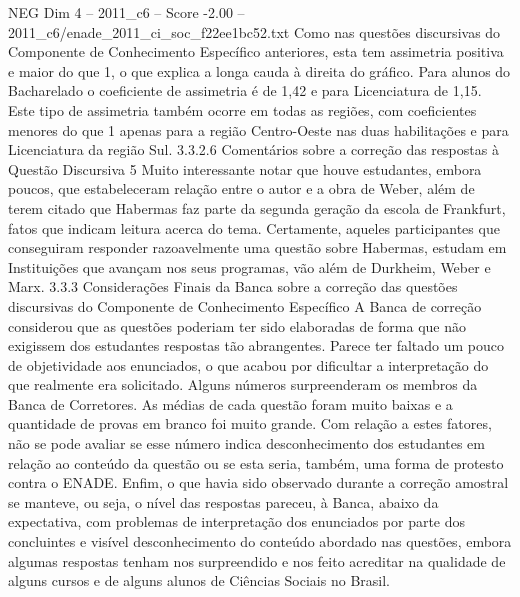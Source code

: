 \begin{textsample}{NEG Dim 4 – 2011\_c6 – Score -2.00 – 2011\_c6/enade\_2011\_ci\_soc\_f22ee1bc52.txt}
Como nas questões discursivas do Componente de Conhecimento Específico anteriores, esta tem assimetria positiva e maior do que 1, o que explica a longa cauda à direita do gráfico.
Para alunos do Bacharelado o coeficiente de assimetria é de 1,42 e para Licenciatura de 1,15.
Este tipo de assimetria também ocorre em todas as regiões, com coeficientes menores do que 1 apenas para a região Centro-Oeste nas duas habilitações e para Licenciatura da região Sul. 3.3.2.6 Comentários sobre a correção das respostas à Questão Discursiva 5 Muito interessante notar que houve estudantes, embora poucos, que estabeleceram relação entre o autor e a obra de Weber, além de terem citado que Habermas faz parte da segunda geração da escola de Frankfurt, fatos que indicam leitura acerca do tema.
Certamente, aqueles participantes que conseguiram responder razoavelmente uma questão sobre Habermas, estudam em Instituições que avançam nos seus programas, vão além de Durkheim, Weber e Marx. 3.3.3 Considerações Finais da Banca sobre a correção das questões discursivas do Componente de Conhecimento Específico A Banca de correção considerou que as questões poderiam ter sido elaboradas de forma que não exigissem dos estudantes respostas tão abrangentes.
Parece ter faltado um pouco de objetividade aos enunciados, o que acabou por dificultar a interpretação do que realmente era solicitado.
Alguns números surpreenderam os membros da Banca de Corretores.
As médias de cada questão foram muito baixas e a quantidade de provas em branco foi muito grande.
Com relação a estes fatores, não se pode avaliar se esse número indica desconhecimento dos estudantes em relação ao conteúdo da questão ou se esta seria, também, uma forma de protesto contra o ENADE.
Enfim, o que havia sido observado durante a correção amostral se manteve, ou seja, o nível das respostas pareceu, à Banca, abaixo da expectativa, com problemas de interpretação dos enunciados por parte dos concluintes e visível desconhecimento do conteúdo abordado nas questões, embora algumas respostas tenham nos surpreendido e nos feito acreditar na qualidade de alguns cursos e de alguns alunos de Ciências Sociais no Brasil.

\end{textsample}

